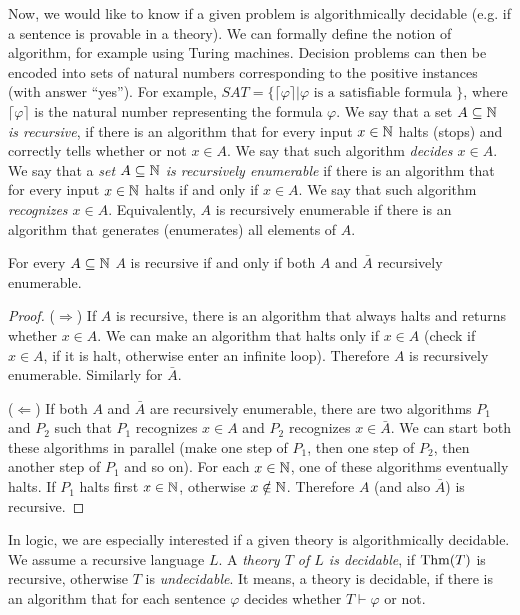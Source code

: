 Now, we would like to know if a given problem is algorithmically decidable (e.g. if a sentence is provable in a theory). We can formally define the notion of algorithm, for example using Turing machines. Decision problems can then be encoded into sets of natural numbers corresponding to the positive instances (with answer ``yes''). For example, $SAT = \{\lceil \varphi \rceil | \varphi \text{ is a satisfiable formula }\}$, where $\lceil \varphi \rceil$ is the natural number representing the formula $\varphi$. We say that a set \emph{$A \subseteq \mathbb{N}$ is recursive}, if there is an algorithm that for every input $x \in \mathbb{N}$ halts (stops) and correctly tells whether or not $x \in A$. We say that such algorithm \emph{decides $x \in A$}. We say that a \emph{set $A \subseteq \mathbb{N}$ is recursively enumerable} if there is an algorithm that for every input $x \in \mathbb{N}$ halts if and only if $x \in A$. We say that such algorithm \emph{recognizes $x \in A$}. Equivalently, $A$ is recursively enumerable if there is an algorithm that generates (enumerates) all elements of $A$. 

\begin{lemma}
For every $A \subseteq \mathbb{N}$ $A$ is recursive if and only if both $A$ and $\bar{A}$ recursively enumerable.
\end{lemma}
\begin{proof}
($\Rightarrow$) If $A$ is recursive, there is an algorithm that always halts and returns whether $x \in A$. We can make an algorithm that halts only if $x \in A$ (check if $x \in A$, if it is halt, otherwise enter an infinite loop). Therefore $A$ is recursively enumerable. Similarly for $\bar{A}$. 

($\Leftarrow$) If both $A$ and $\bar{A}$ are recursively enumerable, there are two algorithms $P_1$ and $P_2$ such that $P_1$ recognizes $x \in A$ and $P_2$ recognizes $x \in \bar{A}$. We can start both these algorithms in parallel (make one step of $P_1$, then one step of $P_2$, then another step of $P_1$ and so on). For each $x \in \mathbb{N}$, one of these algorithms eventually halts. If $P_1$ halts first $x \in \mathbb{N}$, otherwise $x \notin \mathbb{N}$. Therefore $A$ (and also $\bar{A}$) is recursive.
\end{proof}

In logic, we are especially interested if a given theory is algorithmically decidable. We assume a recursive language $L$. A \emph{theory $T$ of $L$ is decidable}, if $\operatorname{Thm}(T)$ is recursive, otherwise $T$ is \emph{undecidable}. It means, a theory is decidable, if there is an algorithm that for each sentence $\varphi$ decides whether $T \vdash \varphi$ or not. 

